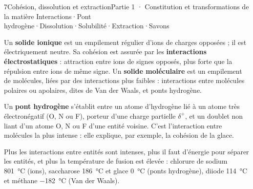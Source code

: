 \begin{ouverture}[micelle]{7}{Cohésion, dissolution et extraction}{Partie 1 · Constitution et transformations de la matière}
{Interactions\enspace·\enspace Pont hydrogène\enspace·\enspace Dissolution\enspace·\enspace Solubilité\enspace·\enspace Extraction\enspace·\enspace Savons}
\end{ouverture}
\essentiel
{}
\begin{definition}
Un \textbf{solide ionique} est un empilement régulier d'ions de charges opposées ; il est électriquement neutre. Sa
cohésion est assurée par les \textbf{interactions électrostatiques} : attraction entre ions de signes opposés, plus forte
que la répulsion entre ions de même signe. Un \textbf{solide moléculaire} est un empilement de molécules, liées par des
interactions plus faibles : interactions entre molécules polaires ou apolaires, dites de Van der Waals, et ponts hydrogène.
\end{definition}
\begin{definition}
Un \textbf{pont hydrogène} s'établit entre un atome d'hydrogène lié à un atome très électronégatif (O, N ou F), porteur d'une
charge partielle $\delta^{+}$, et un doublet non liant d'un atome O, N ou F d'une entité voisine. C'est l'interaction entre
molécules la plus intense : elle explique, par exemple, la cohésion de la glace.
\end{definition}
\begin{propriete}
Plus les interactions entre entités sont intenses, plus il faut d'énergie pour séparer les entités, et plus la température
de fusion est élevée : chlorure de sodium \qty{801}{\degreeCelsius} (ions), saccharose \qty{186}{\degreeCelsius} et glace \qty{0}{\degreeCelsius} (ponts hydrogène),
diiode \qty{114}{\degreeCelsius} et méthane \qty{-182}{\degreeCelsius} (Van der Waals).
\end{propriete}
